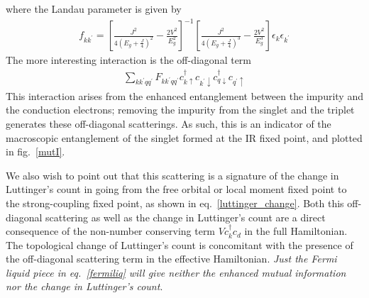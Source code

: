 \documentclass{report}
\numberwithin{equation}{section}
\begin{document}
where the Landau parameter is given by
\begin{equation}\begin{aligned}
	\label{fermiliq}
	f_{kk^\prime} = \left[\frac{J^2}{4\left( E_g + \frac{J}{4} \right)^2} - \frac{2V^2}{E_g^2}\right]^{-1}\left[\frac{J^2}{4\left( E_g + \frac{J}{4} \right) ^3} - \frac{2V^2}{E_g^3}\right]\epsilon_k \epsilon_{k^\prime}
\end{aligned}\end{equation}
The more interesting interaction is the off-diagonal term
\begin{equation}\begin{aligned}
	 \sum_{kk^\prime q q^\prime} F_{kk^\prime qq^\prime}c^\dagger_{k \uparrow}c_{k^\prime \downarrow}c^\dagger_{q \downarrow}c_{q^\prime \uparrow}
\end{aligned}\end{equation}
This interaction arises from the enhanced entanglement between the impurity and the conduction electrons; removing the impurity from the singlet and the triplet generates these off-diagonal scatterings. As such, this is an indicator of the macroscopic entanglement of the singlet formed at the IR fixed point, and plotted in fig.~\ref{mutI}. 

We also wish to point out that this scattering is a signature of the change in Luttinger's count in going from the free orbital or local moment fixed point to the strong-coupling fixed point, as shown in eq.~\eqref{luttinger_change}. Both this off-diagonal scattering as well as the change in Luttinger's count are a direct consequence of the non-number conserving term \(V c^\dagger_{k} c_d\) in the full Hamiltonian. The topological change of Luttinger's count is concomitant with the presence of the off-diagonal scattering term in the effective Hamiltonian. \textit{Just the Fermi liquid piece in eq.~\eqref{fermiliq} will give neither the enhanced mutual information nor the change in Luttinger's count}.
\end{document}
